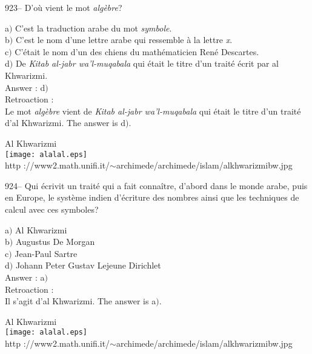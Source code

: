 ﻿\documentclass[letterpaper, 12pt]{article}
\begin{document}
923-- D'o\`u vient le mot {\sl alg\`ebre}?

a$)$ C'est la traduction arabe du mot {\sl symbole}. \\
b$)$ C'est le nom d'une lettre arabe qui ressemble \`a la lettre {\sl x}. \\
c$)$ C'\'etait le nom d'un des chiens du math\'ematicien Ren\'e Descartes.
\\
d$)$ De {\sl Kitab al-jabr wa'l-muqabala} qui \'etait le titre d'un trait\'e
\'ecrit par al Khwarizmi. \\

Answer : d$)$\\

Retroaction : \\
Le mot {\sl alg\`ebre} vient de {\sl Kitab al-jabr wa'l-muqabala} qui
\'etait le titre d'un trait\'e d'al Khwarizmi. The answer is d$)$.\\

        \begin{center}
        Al Khwarizmi\\
    \texttt{[image: alalal.eps]}\\
        {\footnotesize http
://www2.math.unifi.it/$\sim$archimede/archimede/islam/alkhwarizmibw.jpg}
    \end{center}

924-- Qui \'ecrivit un trait\'e qui a fait conna\^itre, d'abord dans
le monde arabe, puis en Europe, le syst\`eme indien d'\'ecriture des
nombres ainsi que les techniques de calcul avec ces symboles?

a$)$ Al Khwarizmi \\
b$)$ Augustus De Morgan \\
c$)$ Jean-Paul Sartre \\
d$)$ Johann Peter Gustav Lejeune Dirichlet\\

Answer : a$)$\\

Retroaction :\\
Il s'agit d'al Khwarizmi. The answer is a$)$.\\

        \begin{center}
        Al Khwarizmi\\
    \texttt{[image: alalal.eps]}\\
        {\footnotesize http
://www2.math.unifi.it/$\sim$archimede/archimede/islam/alkhwarizmibw.jpg}
    \end{center}
\end{document}

